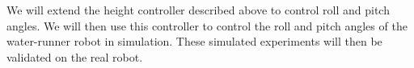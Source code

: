 We will extend the height controller described above to control roll and pitch angles. We will then use this controller to control the roll and pitch angles of the water-runner robot in simulation. These simulated experiments will then be validated on the real robot.

